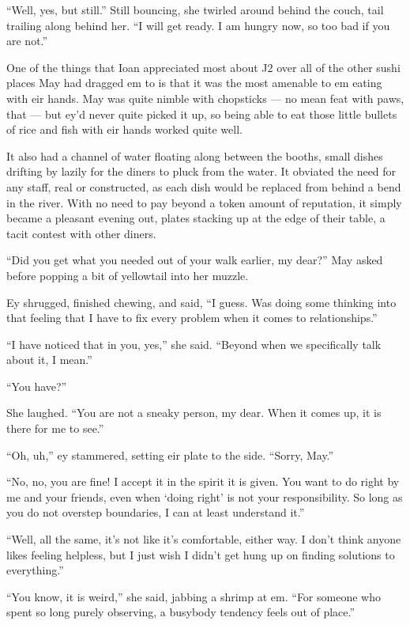 ``Well, yes, but still.'' Still bouncing, she twirled around behind the couch, tail trailing along behind her. ``I will get ready. I am hungry now, so too bad if you are not.''

One of the things that Ioan appreciated most about J2 over all of the other sushi places May had dragged em to is that it was the most amenable to em eating with eir hands. May was quite nimble with chopsticks — no mean feat with paws, that — but ey'd never quite picked it up, so being able to eat those little bullets of rice and fish with eir hands worked quite well.

It also had a channel of water floating along between the booths, small dishes drifting by lazily for the diners to pluck from the water. It obviated the need for any staff, real or constructed, as each dish would be replaced from behind a bend in the river. With no need to pay beyond a token amount of reputation, it simply became a pleasant evening out, plates stacking up at the edge of their table, a tacit contest with other diners.

``Did you get what you needed out of your walk earlier, my dear?'' May asked before popping a bit of yellowtail into her muzzle.

Ey shrugged, finished chewing, and said, ``I guess. Was doing some thinking into that feeling that I have to fix every problem when it comes to relationships.''

``I have noticed that in you, yes,'' she said. ``Beyond when we specifically talk about it, I mean.''

``You have?''

She laughed. ``You are not a sneaky person, my dear. When it comes up, it is there for me to see.''

``Oh, uh,'' ey stammered, setting eir plate to the side. ``Sorry, May.''

``No, no, you are fine! I accept it in the spirit it is given. You want to do right by me and your friends, even when `doing right' is not your responsibility. So long as you do not overstep boundaries, I can at least understand it.''

``Well, all the same, it's not like it's comfortable, either way. I don't think anyone likes feeling helpless, but I just wish I didn't get hung up on finding solutions to everything.''

``You know, it is weird,'' she said, jabbing a shrimp at em. ``For someone who spent so long purely observing, a busybody tendency feels out of place.''

